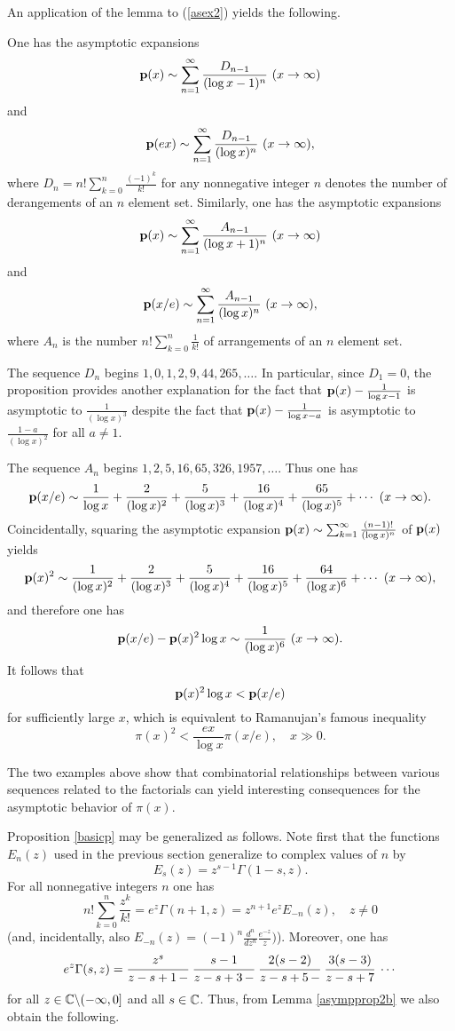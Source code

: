 \documentclass[12pt]{article}
\begin{document}
An application of the lemma to (\ref{asex2}) yields the following.

\begin{proposition}\label{basicp}
One has the asymptotic expansions
$${\mathbf p}(x) \sim \sum_{n=1}^\infty \frac{D_{n-1}}{(\log x-1)^n} \ (x \to \infty)$$
and
$${\mathbf p}(ex) \sim \sum_{n=1}^\infty \frac{D_{n-1}}{(\log x )^n} \ (x \to \infty),$$
where $D_n = n!\sum_{k = 0}^n \frac{(-1)^k}{k!}$ for any nonnegative integer $n$ denotes the number of derangements of an $n$ element set.  Similarly, one has the asymptotic expansions
$${\mathbf p}(x) \sim \sum_{n=1}^\infty \frac{A_{n-1}}{(\log x+1)^n} \ (x \to \infty)$$
and
$${\mathbf p}(x/e) \sim \sum_{n=1}^\infty \frac{A_{n-1}}{(\log x )^n} \ (x \to \infty),$$
where $A_n$ is the number $n! \sum_{k = 0}^n \frac{1}{k!}$ of arrangements of an $n$ element set. 
\end{proposition}

The sequence $D_n$ begins $1,0,1,2,9,44,265,\ldots$.   In particular, since $D_1 = 0$, the proposition provides another explanation for the fact that ${\mathbf p}(x) - \frac{1}{\log x -1}$ is asymptotic to $\frac{1}{(\log x)^3}$ despite the fact that ${\mathbf p}(x) - \frac{1}{\log x-a}$ is asymptotic to $\frac{1-a}{(\log x)^2}$ for all $a \neq 1$.

The sequence  $A_n$  begins $1,2,5,16,65,326,1957,\ldots$.    Thus one has
$${\mathbf p}(x/e) \sim \frac{1}{\log x} +  \frac{2}{(\log x)^2} + \frac{5}{(\log x)^3} + \frac{16}{(\log x)^4} + \frac{65}{(\log x)^5}  + \cdots \ (x \to \infty).$$
Coincidentally, squaring the asymptotic expansion ${\mathbf p}(x) \sim \sum_{k = 1}^\infty \frac{(n-1)!}{(\log x)^n}$ of ${\mathbf p}(x)$ yields
$${\mathbf p}(x)^2 \sim \frac{1}{(\log x)^2} +  \frac{2}{(\log x)^3} + \frac{5}{(\log x)^4} + \frac{16}{(\log x)^5} + \frac{64}{(\log x)^6}  + \cdots \ (x \to \infty),$$
and therefore one has
$$ {\mathbf p}(x/e) - {\mathbf p}(x)^2 \log x  \sim \frac{1}{(\log x)^6} \ (x \to \infty).$$
It follows that
$${\mathbf p}(x)^2 \log x  < {\mathbf p}(x/e)$$ for sufficiently large $x$, which is equivalent to Ramanujan's famous inequality
$$\pi(x)^2 < \frac{ex}{\log x} \pi(x/e), \quad x \gg 0.$$


The two examples above show that combinatorial relationships between various sequences related to the factorials can yield interesting consequences for the asymptotic behavior of $\pi(x)$. 

Proposition \ref{basicp} may be generalized as follows.  Note first that the functions $E_n(z)$ used in the previous section generalize to complex values of $n$ by
$$E_s(z) = z^{s-1} \Gamma(1-s, z).$$
For all nonnegative integers $n$ one has
$$n! \sum_{k = 0}^n \frac{z^k}{k!} = e^z \Gamma(n+1,z) = z^{n+1} e^z E_{-n}(z),  \quad  z \neq 0$$
(and, incidentally, also $E_{-n}(z) = (-1)^n\frac{d^n}{dz^n} \frac{ e^{-z}}{z})$).  Moreover, one has $$e^{z} \Gamma(s,z)  =  \cfrac{ z^{s}}{z -s+ 1 \, -} \  \cfrac{s-1}{z - s + 3 \,-}\  \cfrac{2(s-2)}{z-s+5 \,-}\  \cfrac{3(s-3)}{z-s+7} \ \cdots $$
for all $z \in {\mathbb C}\backslash(-\infty,0]$ and all $s \in {\mathbb C}$.  Thus, from Lemma \ref{asympprop2b} we also obtain the following.
\end{document}

